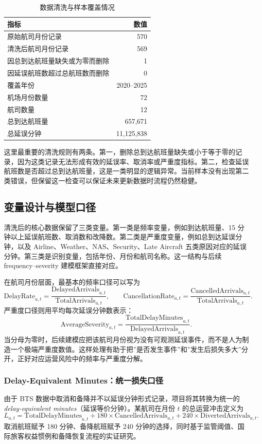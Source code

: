 \documentclass[UTF8,fontset=fandol,11pt]{ctexart}
\begin{document}
\begin{table}[H]
\centering
\caption{数据清洗与样本覆盖情况}
\begin{tabular}{lr}
\toprule
指标 & 数值 \\
\midrule
原始航司月份记录 & 570 \\
清洗后航司月份记录 & 569 \\
因总到达航班量缺失或为零而删除 & 1 \\
因延误航班数超过总航班数而删除 & 0 \\
覆盖年份 & 2020--2025 \\
机场月份数量 & 72 \\
航司数量 & 12 \\
总到达航班量 & 657,671 \\
总延误分钟 & 11,125,838 \\
\bottomrule
\end{tabular}
\end{table}

这里最重要的清洗规则有两条。第一，删除总到达航班量缺失或小于等于零的记录，因为这类记录无法形成有效的延误率、取消率或严重度指标。第二，检查延误航班数是否超过总到达航班量，这是一类明显的逻辑异常。当前样本没有出现第二类错误，但保留这一检查可以保证未来更新数据时流程仍然稳健。

\subsection{变量设计与模型口径}
清洗后的核心数据保留了三类变量。第一类是频率变量，例如到达航班量、15 分钟以上延误航班数、取消数和改降数。第二类是严重度变量，例如总到达延误分钟，以及 Airline、Weather、NAS、Security、Late Aircraft 五类原因对应的延误分钟。第三类是识别变量，包括年份、月份和航司名称。这一结构与后续 frequency--severity 建模框架直接对应。

在航司月份层面，最基本的频率口径可以写为
\[
\mathrm{DelayRate}_{a,t} =
\frac{\mathrm{DelayedArrivals}_{a,t}}{\mathrm{TotalArrivals}_{a,t}},
\qquad
\mathrm{CancellationRate}_{a,t} =
\frac{\mathrm{CancelledArrivals}_{a,t}}{\mathrm{TotalArrivals}_{a,t}}.
\]
严重度口径则用平均每次延误分钟数表示：
\[
\mathrm{AverageSeverity}_{a,t} =
\frac{\mathrm{TotalDelayMinutes}_{a,t}}{\mathrm{DelayedArrivals}_{a,t}}.
\]
当分母为零时，后续建模应把该航司月份视为没有可观测延误事件，而不是人为制造一个极端严重度数值。这样处理有助于把”是否发生事件”和”发生后损失多大”分开，正好对应运营风险中的频率与严重度分解。

\subsubsection*{Delay-Equivalent Minutes：统一损失口径}
由于 BTS 数据中取消和备降并不以延误分钟形式记录，项目将其转换为统一的 \emph{delay-equivalent minutes}（延误等价分钟）。某航司在月份 $t$ 的总运营冲击定义为
\[
L_{a,t} = \mathrm{TotalDelayMinutes}_{a,t}
         + 180 \times \mathrm{CancelledArrivals}_{a,t}
         + 240 \times \mathrm{DivertedArrivals}_{a,t}.
\]
取消航班赋予 180 分钟、备降航班赋予 240 分钟的选择，同时基于监管阈值、国际旅客权益惯例和备降恢复流程的实证研究。
\end{document}
